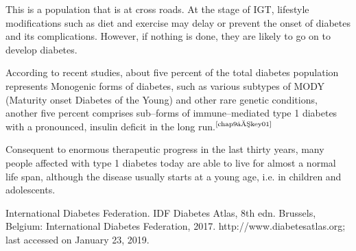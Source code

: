 This is a population that is at cross roads. At the stage of IGT, lifestyle modifications such as diet and exercise may delay or prevent the onset of diabetes and its complications. However, if nothing is done, they are likely to go on to develop diabetes.

According to recent studies, about five percent of the total diabetes population represents Monogenic forms of diabetes, such as various subtypes of MODY (Maturity onset Diabetes of the Young) and other rare genetic conditions, another five percent comprises sub–forms of immune–mediated type 1 diabetes with a pronounced, insulin deficit in the long run.$^{\text{\cite{chap9–key01}}}$

Consequent to enormous therapeutic progress in the last thirty years, many people affected with type 1 diabetes today are able to live for almost a normal life span, although the disease usually starts at a young age, i.e. in children and adolescents.

\begin{thebibliography}{99}
 International Diabetes Federation. IDF Diabetes Atlas, 8th edn. Brussels, Belgium: International Diabetes Federation, 2017. http://www.diabetesatlas.org; last accessed on January 23, 2019.
\end{thebibliography}
